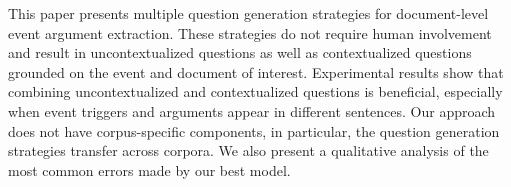 This paper presents multiple question generation strategies for document-level event argument extraction. These strategies do not require human involvement and result in uncontextualized questions as well as contextualized questions grounded on the event and document of interest. Experimental results show that combining uncontextualized and contextualized questions is beneficial, especially when event triggers and arguments appear in different sentences. Our approach does not have corpus-specific components, in particular, the question generation strategies transfer across corpora. We also present a qualitative analysis of the most common errors made by our best model.
